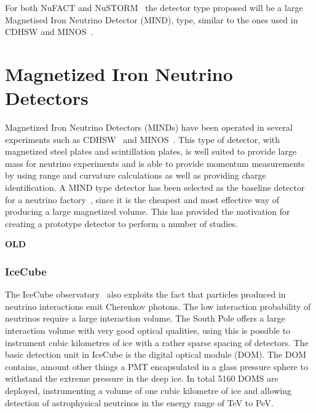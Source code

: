 For both NuFACT and NuSTORM~\cite{77nustorm} the detector type proposed will be a large Magnetised Iron Neutrino Detector (MIND), type, similar to the ones used in CDHSW and MINOS~\cite{NuFACTIDS}.

\pagebreak
\section{Magnetized Iron Neutrino Detectors}\label{subsec:MINDdetector}

Magnetized Iron Neutrino Detectors (MINDs) have been operated in several experiments such as CDHSW~\cite{40CDHSW} and MINOS~\cite{MINOS}. This type of detector, with magnetized steel plates and scintillation plates, is well suited to provide large mass for neutrino experiments and is able to provide momentum measurements by using range and curvature calculations as well as providing charge identification. A MIND type detector has been selected as the baseline detector for a neutrino factory~\cite{ISS, 27Bross}, since it is the cheapest and most effective way of producing a large magnetized volume. This has provided the motivation for creating a prototype detector to perform a number of studies.


\textbf{OLD}

\subsubsection{IceCube}
The IceCube observatory~\cite{43IceCube} also exploits the fact that particles produced in neutrino interactions emit Cherenkov photons. The low interaction probability of neutrinos require a large interaction volume. The South Pole offers a large interaction volume with very good optical qualities, using this is possible to instrument cubic kilometres of ice with a rather sparse spacing of detectors. The basic detection unit in IceCube is the digital optical module (DOM). The DOM contains, amount other things a PMT encapsulated in a glass pressure sphere to withstand the extreme pressure in the deep ice. In total 5160 DOMS are deployed, instrumenting a volume of one cubic kilometre of ice and allowing detection of astrophysical neutrinos in the energy range of TeV to PeV.

